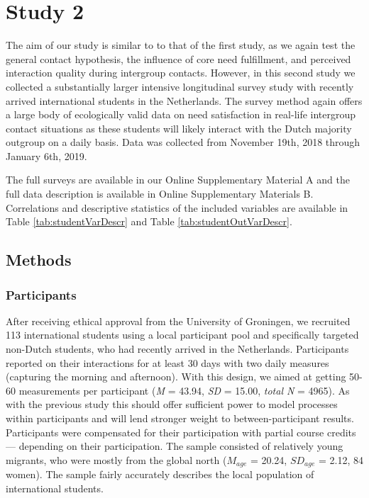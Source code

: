 \section{Study 2}

The aim of our study is similar to to that of the first study, as we
again test the general contact hypothesis, the influence of core need
fulfillment, and perceived interaction quality during intergroup
contacts. However, in this second study we collected a substantially
larger intensive longitudinal survey study with recently arrived
international students in the Netherlands. The survey method again
offers a large body of ecologically valid data on need satisfaction in
real-life intergroup contact situations as these students will likely
interact with the Dutch majority outgroup on a daily basis. Data was
collected from November 19th, 2018 through January 6th, 2019.

The full surveys are available in our Online Supplementary Material A
and the full data description is available in Online Supplementary
Materials B. Correlations and descriptive statistics of the included
variables are available in Table \ref{tab:studentVarDescr} and Table
\ref{tab:studentOutVarDescr}.

\subsection{Methods}

\subsubsection{Participants}

After receiving ethical approval from the University of Groningen, we
recruited 113 international students using a local participant pool and
specifically targeted non-Dutch students, who had recently arrived in
the Netherlands. Participants reported on their interactions for at
least 30 days with two daily measures (capturing the morning and
afternoon). With this design, we aimed at getting 50-60 measurements per
participant (\textit{M} = 43.94, \textit{SD} = 15.00, \textit{total N} =
4965). As with the previous study this should offer sufficient power to
model processes within participants and will lend stronger weight to
between-participant results. Participants were compensated for their
participation with partial course credits --- depending on their
participation. The sample consisted of relatively young migrants, who
were mostly from the global north (\(M_{age}\) = 20.24, \(SD_{age}\) =
2.12, 84 women). The sample fairly accurately describes the local
population of international students.

